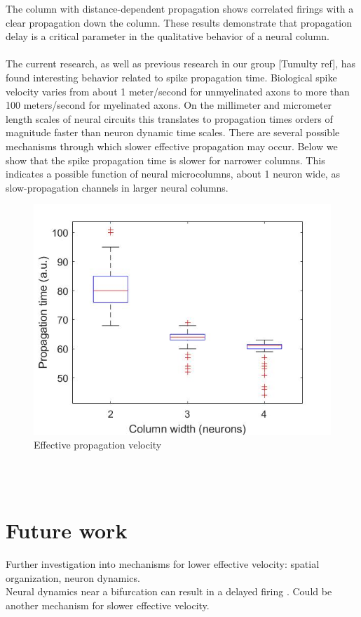 \documentclass[a4paper,11pt]{article}
\begin{document}
The column with distance-dependent propagation shows correlated firings with a clear propagation down the column.
These results demonstrate that propagation delay is a critical parameter in the qualitative behavior of a neural column.
\\ \\
The current research, as well as previous research in our group [Tumulty ref], has found interesting behavior related to spike propagation time.
Biological spike velocity varies from about 1 meter/second for unmyelinated axons to  more than 100 meters/second for myelinated axons.
On the millimeter and micrometer length scales of neural circuits this translates to propagation times orders of magnitude faster than neuron dynamic time scales.
There are several possible mechanisms through which slower effective propagation may occur.
Below we show that the spike propagation time is slower for narrower columns. 
This indicates a possible function of neural microcolumns, about 1 neuron wide, as slow-propagation channels in larger neural columns.
\\
\begin{figure}
 \caption{Effective propagation velocity}
 \centering
   \includegraphics[width=\textwidth]{fig/propagation_time}
\end{figure}
\\ \\

\section{Future work}
Further investigation into mechanisms for lower effective velocity: spatial organization, neuron dynamics.\\
Neural dynamics near a bifurcation can result in a delayed firing \cite{izhikevich}.
Could be another mechanism for slower effective velocity.

\printbibliography
\end{document}
